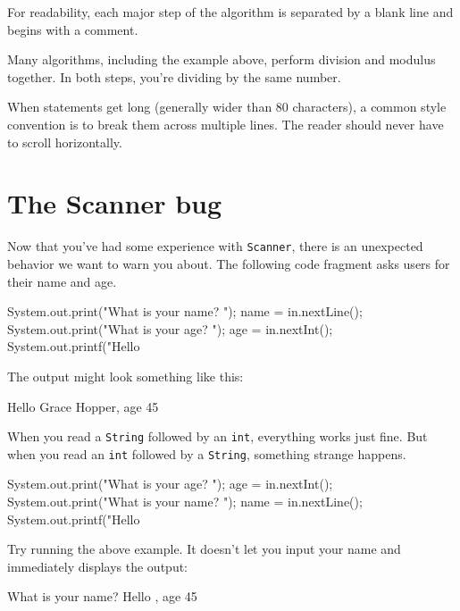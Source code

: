 \documentclass[12pt]{book}
\theoremstyle{exercise}
\newcommand{\java}[1]{\verb"#1"}
\begin{document}
For readability, each major step of the algorithm is separated by a blank line and begins with a comment.

Many algorithms, including the example above, perform division and modulus together.
In both steps, you're dividing by the same number.


When statements get long (generally wider than 80 characters), a common style convention is to break them across multiple lines.
The reader should never have to scroll horizontally.


\section{The Scanner bug}

Now that you've had some experience with \java{Scanner}, there is an unexpected behavior we want to warn you about.
The following code fragment asks users for their name and age.

\begin{code}
    System.out.print("What is your name? ");
    name = in.nextLine();
    System.out.print("What is your age? ");
    age = in.nextInt();
    System.out.printf("Hello %
\end{code}

The output might look something like this:

\begin{stdout}
Hello Grace Hopper, age 45
\end{stdout}

When you read a \java{String} followed by an \java{int}, everything works just fine.
But when you read an \java{int} followed by a \java{String}, something strange happens.

\begin{code}
    System.out.print("What is your age? ");
    age = in.nextInt();
    System.out.print("What is your name? ");
    name = in.nextLine();
    System.out.printf("Hello %
\end{code}

Try running the above example.
It doesn't let you input your name and immediately displays the output:

\begin{stdout}
What is your name? Hello , age 45
\end{stdout}
\end{document}
